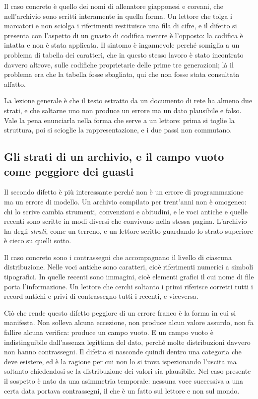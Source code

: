 Il caso concreto è quello dei nomi di allenatore giapponesi e coreani, che nell'archivio sono scritti interamente in quella forma. Un lettore che tolga i marcatori e non sciolga i riferimenti restituisce una fila di cifre, e il difetto si presenta con l'aspetto di un guasto di codifica mentre è l'opposto: la codifica è intatta e non è stata applicata. Il sintomo è ingannevole perché somiglia a un problema di tabella dei caratteri, che in questo stesso lavoro è stato incontrato davvero altrove, sulle codifiche proprietarie delle prime tre generazioni; là il problema era che la tabella fosse sbagliata, qui che non fosse stata consultata affatto.

La lezione generale è che il testo estratto da un documento di rete ha almeno due strati, e che saltarne uno non produce un errore ma un dato plausibile e falso. Vale la pena enunciarla nella forma che serve a un lettore: prima si toglie la struttura, poi si scioglie la rappresentazione, e i due passi non commutano.

\subsection{Gli strati di un archivio, e il campo vuoto come peggiore dei guasti}

Il secondo difetto è più interessante perché non è un errore di programmazione ma un errore di modello. Un archivio compilato per trent'anni non è omogeneo: chi lo scrive cambia strumenti, convenzioni e abitudini, e le voci antiche e quelle recenti sono scritte in modi diversi che convivono nella stessa pagina. L'archivio ha degli \emph{strati}, come un terreno, e un lettore scritto guardando lo strato superiore è cieco su quelli sotto.

Il caso concreto sono i contrassegni che accompagnano il livello di ciascuna distribuzione. Nelle voci antiche sono caratteri, cioè riferimenti numerici a simboli tipografici. In quelle recenti sono immagini, cioè elementi grafici il cui nome di file porta l'informazione. Un lettore che cerchi soltanto i primi riferisce corretti tutti i record antichi e privi di contrassegno tutti i recenti, e viceversa.

Ciò che rende questo difetto peggiore di un errore franco è la forma in cui si manifesta. Non solleva alcuna eccezione, non produce alcun valore assurdo, non fa fallire alcuna verifica: produce un campo vuoto. E un campo vuoto è indistinguibile dall'assenza legittima del dato, perché molte distribuzioni davvero non hanno contrassegni. Il difetto si nasconde quindi dentro una categoria che deve esistere, ed è la ragione per cui non lo si trova ispezionando l'uscita ma soltanto chiedendosi se la distribuzione dei valori sia plausibile. Nel caso presente il sospetto è nato da una asimmetria temporale: nessuna voce successiva a una certa data portava contrassegni, il che è un fatto sul lettore e non sul mondo.

